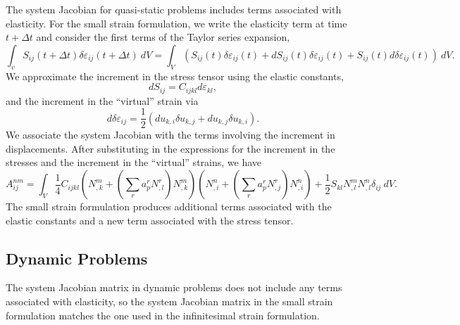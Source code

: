 The system Jacobian for quasi-static problems includes terms associated
with elasticity. For the small strain formulation, we write the elasticity
term at time $t+\Delta t$ and consider the first terms of the Taylor
series expansion,
\begin{equation}
\int_{v}S_{ij}(t+\Delta t)\delta\varepsilon_{ij}(t+\Delta t)\: dV=\int_{V}(S_{ij}(t)\delta\varepsilon_{ij}(t)+dS_{ij}(t)\delta\varepsilon_{ij}(t)+S_{ij}(t)d\delta\varepsilon_{ij}(t))\: dV.
\end{equation}
We approximate the increment in the stress tensor using the elastic
constants,
\begin{equation}
dS_{ij}=C_{ijkl}d\varepsilon_{kl},
\end{equation}
and the increment in the ``virtual'' strain via
\begin{equation}
d\delta\varepsilon_{ij}=\frac{1}{2}(du_{k,i}\delta u_{k,j}+du_{k,j}\delta u_{k,i}).
\end{equation}
We associate the system Jacobian with the terms involving the increment
in displacements. After substituting in the expressions for the increment
in the stresses and the increment in the ``virtual'' strains, we
have
\begin{equation}
A_{ij}^{nm}=\int_{V}\frac{1}{4}C_{ijkl}(N_{,k}^{m}+(\sum_{r}a_{p}^{r}N_{,l}^{r})N_{,k}^{m})(N_{,i}^{n}+(\sum_{r}a_{p}^{r}N_{,j}^{r})N_{,i}^{n})+\frac{1}{2}S_{kl}N_{,l}^{m}N_{,l}^{n}\delta_{ij}\: dV.
\end{equation}
The small strain formulation produces additional terms associated
with the elastic constants and a new term associated with the stress
tensor.


\subsection{Dynamic Problems}

The system Jacobian matrix in dynamic problems does not include any
terms associated with elasticity, so the system Jacobian matrix in
the small strain formulation matches the one used in the infinitesimal
strain formulation.
